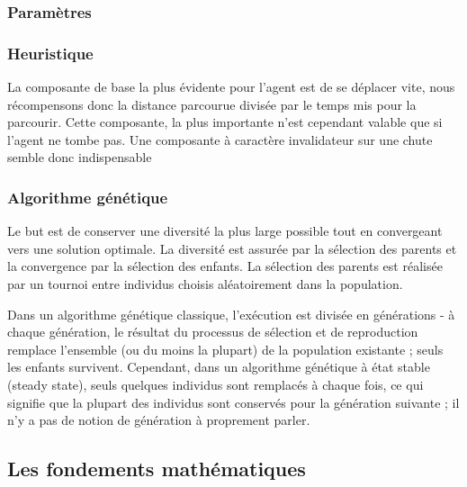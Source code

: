 \documentclass[journal, a4paper]{IEEEtran}
\begin{document}
	\subsubsection{Paramètres}

	\subsubsection{Heuristique}

	La composante de base la plus évidente pour l'agent est de se
	déplacer vite, nous récompensons donc la distance parcourue
	divisée par le temps mis pour la parcourir. Cette composante,
	la plus importante n'est cependant valable que si l'agent ne tombe
	pas. Une composante à caractère invalidateur sur une chute semble
	donc indispensable

	\subsubsection{Algorithme génétique}

	Le but est de conserver une diversité la plus large possible
	tout en convergeant vers une solution optimale.
	La diversité est assurée par la sélection des parents
	et la convergence par la sélection des enfants.
	La sélection des parents est réalisée par un tournoi
	entre individus choisis aléatoirement dans la population.

	Dans un algorithme génétique classique,
	l'exécution est divisée en générations -
	à chaque génération, le résultat du processus de sélection
	et de reproduction remplace l'ensemble (ou du moins la plupart)
	de la population existante ; seuls les enfants survivent.
	Cependant, dans un algorithme génétique à état stable (steady state),
	seuls quelques individus sont remplacés à chaque fois,
	ce qui signifie que la plupart des individus sont conservés pour
	la génération suivante ;
	il n'y a pas de notion de génération à proprement parler.

	\subsection{Les fondements mathématiques}\label{subsec:les-fondements-mathematiques}
\end{document}
